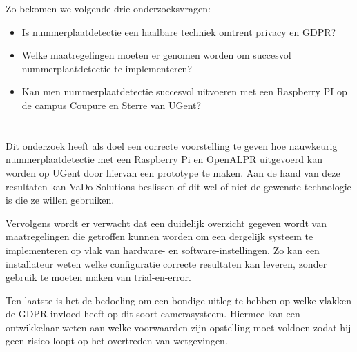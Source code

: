 Zo bekomen we volgende drie onderzoeksvragen:
\begin{itemize}
	\item Is nummerplaatdetectie een haalbare techniek omtrent privacy en GDPR?
	\item Welke maatregelingen moeten er genomen worden om succesvol nummerplaatdetectie te implementeren?
	\item Kan men nummerplaatdetectie succesvol uitvoeren met een Raspberry PI op de campus Coupure en Sterre van UGent?
\end{itemize}

\section{}
\label{sec:onderzoeksdoelstelling}


Dit onderzoek heeft als doel een correcte voorstelling te geven hoe nauwkeurig nummerplaatdetectie met een Raspberry Pi en OpenALPR uitgevoerd kan worden op UGent door hiervan een prototype te maken. Aan de hand van deze resultaten kan VaDo-Solutions beslissen of dit wel of niet de gewenste technologie is die ze willen gebruiken.

Vervolgens wordt er verwacht dat een duidelijk overzicht gegeven wordt van maatregelingen die getroffen kunnen worden om een dergelijk systeem te implementeren op vlak van hardware- en software-instellingen. Zo kan een installateur weten welke configuratie correcte resultaten kan leveren, zonder gebruik te moeten maken van trial-en-error.

Ten laatste is het de bedoeling om een bondige uitleg te hebben op welke vlakken de GDPR invloed heeft op dit soort camerasysteem. Hiermee kan een ontwikkelaar weten aan welke voorwaarden zijn opstelling moet voldoen zodat hij geen risico loopt op het overtreden van wetgevingen.

\section{}
\label{sec:opzet-bachelorproef}

